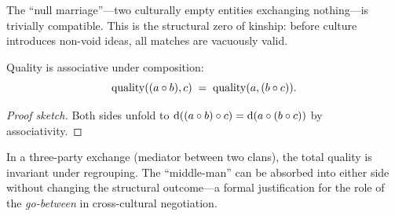 The ``null marriage''---two culturally empty entities exchanging nothing---is
trivially compatible.  This is the structural zero of kinship: before culture
introduces non-void ideas, all matches are vacuously valid.

\begin{theorem}
\label{thm:quality-assoc}
Quality is associative under composition:
\[
  \operatorname{quality}((a \circ b), c)
  \;=\;
  \operatorname{quality}(a, (b \circ c)).
\]
\end{theorem}

\begin{proof}[Proof sketch]
Both sides unfold to $\operatorname{d}((a \circ b) \circ c) = \operatorname{d}(a \circ (b \circ c))$
by associativity.
\end{proof}

In a three-party exchange (mediator between two clans), the total quality is
invariant under regrouping.  The ``middle-man'' can be absorbed into either
side without changing the structural outcome---a formal justification for the
role of the \emph{go-between} in cross-cultural negotiation.

